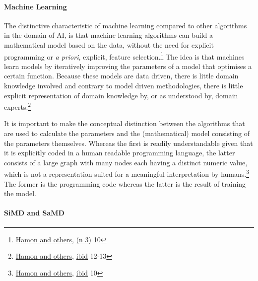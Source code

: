\documentclass[
]{scrartcl}
\begin{document}
\hypertarget{machine-learning}{%
\paragraph*{Machine Learning}\label{machine-learning}}

The distinctive characteristic of machine learning compared to other algorithms in the domain of AI, is that machine learning algorithms can build a mathematical model based on the data, without the need for explicit programming or \emph{a priori}, explicit, feature selection.\footnote{\protect\hyperlink{ref-hamonRobustnessExplainabilityArtificial2020}{Hamon and others}, \protect\hyperlink{ref-hamonRobustnessExplainabilityArtificial2020}{(n 3)} 10} The idea is that machines learn models by iteratively improving the parameters of a model that optimises a certain function. Because these models are data driven, there is little domain knowledge involved and contrary to model driven methodologies, there is little explicit representation of domain knowledge by, or as understood by, domain experts.\footnote{\protect\hyperlink{ref-hamonRobustnessExplainabilityArtificial2020}{Hamon and others}, \protect\hyperlink{ref-hamonRobustnessExplainabilityArtificial2020}{ibid} 12-13}

It is important to make the conceptual distinction between the algorithms that are used to calculate the parameters and the (mathematical) model consisting of the parameters themselves. Whereas the first is readily understandable given that it is explicitly coded in a human readable programming language, the latter consists of a large graph with many nodes each having a distinct numeric value, which is not a representation suited for a meaningful interpretation by humans.\footnote{\protect\hyperlink{ref-hamonRobustnessExplainabilityArtificial2020}{Hamon and others}, \protect\hyperlink{ref-hamonRobustnessExplainabilityArtificial2020}{ibid} 10} The former is the programming code whereas the latter is the result of training the model.

\hypertarget{simd-and-samd}{%
\paragraph*{SiMD and SaMD}\label{simd-and-samd}}
\end{document}
